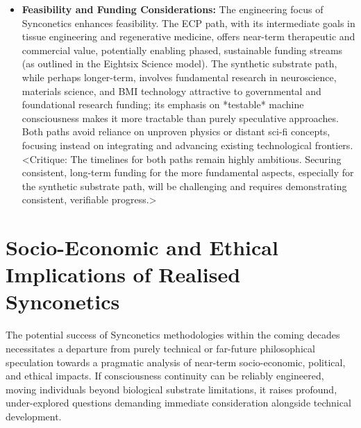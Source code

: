 \documentclass[10pt]{article}
\begin{document}
\begin{sloppypar}
\begin{itemize}
    \item \textbf{Feasibility and Funding Considerations:} The engineering focus of Synconetics enhances feasibility. The ECP path, with its intermediate goals in tissue engineering and regenerative medicine, offers near-term therapeutic and commercial value, potentially enabling phased, sustainable funding streams (as outlined in the Eightsix Science model). The synthetic substrate path, while perhaps longer-term, involves fundamental research in neuroscience, materials science, and BMI technology attractive to governmental and foundational research funding; its emphasis on *testable* machine consciousness makes it more tractable than purely speculative approaches. Both paths avoid reliance on unproven physics or distant sci-fi concepts, focusing instead on integrating and advancing existing technological frontiers. <Critique: The timelines for both paths remain highly ambitious. Securing consistent, long-term funding for the more fundamental aspects, especially for the synthetic substrate path, will be challenging and requires demonstrating consistent, verifiable progress.>

  \end{itemize}

  \section{Socio-Economic and Ethical Implications of Realised Synconetics}
  \label{sec:economics}

  The potential success of Synconetics methodologies within the coming decades necessitates a departure from purely technical or far-future philosophical speculation towards a pragmatic analysis of near-term socio-economic, political, and ethical impacts. If consciousness continuity can be reliably engineered, moving individuals beyond biological substrate limitations, it raises profound, under-explored questions demanding immediate consideration alongside technical development.


\end{sloppypar}
\end{document}
